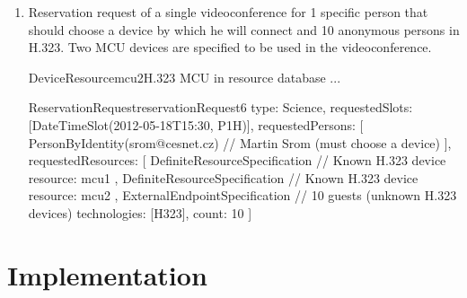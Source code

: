 \begin{enumerate}
\begin{EntityExample}{ReservationRequest}{reservationRequest5}{}
type: Science,
requestedSlots: [DateTimeSlot(2012-05-18T15:30, P1H)],
requestedResources: [
  VirtualRoomSpecification {
    device: mcu1,
    size: 4
  },
  DefiniteResourceSpecification { // Known H.323 device
    resource: terminal2
  },
  DefiniteResourceSpecification { // Known H.323 device
    resource: terminal3
  }
]
\end{EntityExample}

\item Reservation request of a single videoconference for 1 specific person that should choose a device by which he will connect and 10 anonymous persons in H.323. Two MCU devices are specified to be used in the videoconference.


\begin{EntityExample}{DeviceResource}{mcu2}{H.323 MCU in resource database}
...
\end{EntityExample}

\begin{EntityExample}{ReservationRequest}{reservationRequest6}{}
type: Science,
requestedSlots: [DateTimeSlot(2012-05-18T15:30, P1H)],
requestedPersons: [
  PersonByIdentity(srom@cesnet.cz) // Martin Srom (must choose a device)
],
requestedResources: [
  DefiniteResourceSpecification { // Known H.323 device
    resource: mcu1
  },
  DefiniteResourceSpecification { // Known H.323 device
    resource: mcu2
  },
  ExternalEndpointSpecification { // 10 guests (unknown H.323 devices)
    technologies: [H323],
    count: 10
  }
]
\end{EntityExample}

\end{enumerate}


\section{Implementation}

